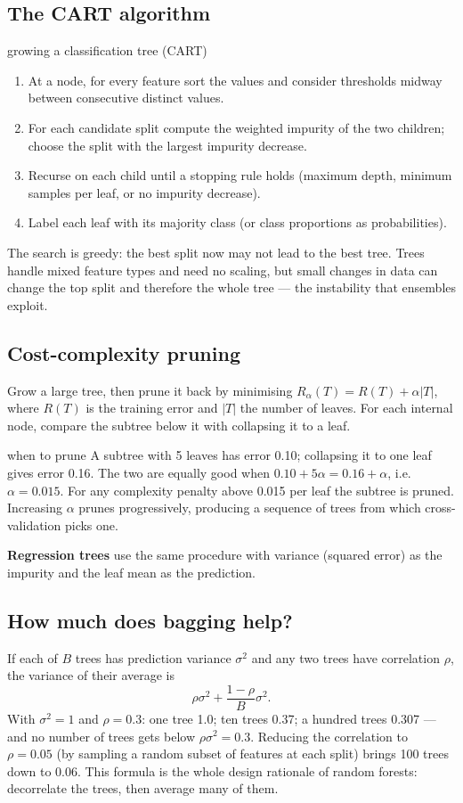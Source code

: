 \documentclass[11pt]{article}
\begin{document}
\subsection{The CART algorithm}
\begin{algo}{growing a classification tree (CART)}
\begin{enumerate}[leftmargin=1.5em]
\item At a node, for every feature sort the values and consider thresholds midway between consecutive distinct values.
\item For each candidate split compute the weighted impurity of the two children; choose the split with the largest impurity decrease.
\item Recurse on each child until a stopping rule holds (maximum depth, minimum samples per leaf, or no impurity decrease).
\item Label each leaf with its majority class (or class proportions as probabilities).
\end{enumerate}
\end{algo}
The search is greedy: the best split now may not lead to the best tree. Trees handle mixed feature types and need no scaling, but small changes in data can change the top split and therefore the whole tree --- the instability that ensembles exploit.
\subsection{Cost-complexity pruning}
Grow a large tree, then prune it back by minimising $R_\alpha(T)=R(T)+\alpha|T|$, where $R(T)$ is the training error and $|T|$ the number of leaves. For each internal node, compare the subtree below it with collapsing it to a leaf.
\begin{example}{when to prune}
A subtree with 5 leaves has error 0.10; collapsing it to one leaf gives error 0.16. The two are equally good when $0.10+5\alpha=0.16+\alpha$, i.e.\ $\alpha=0.015$. For any complexity penalty above 0.015 per leaf the subtree is pruned. Increasing $\alpha$ prunes progressively, producing a sequence of trees from which cross-validation picks one.
\end{example}
\textbf{Regression trees} use the same procedure with variance (squared error) as the impurity and the leaf mean as the prediction.

\subsection{How much does bagging help?}
If each of $B$ trees has prediction variance $\sigma^2$ and any two trees have correlation $\rho$, the variance of their average is
\[\rho\sigma^2+\frac{1-\rho}{B}\sigma^2.\]
With $\sigma^2=1$ and $\rho=0.3$: one tree 1.0; ten trees 0.37; a hundred trees 0.307 --- and no number of trees gets below $\rho\sigma^2=0.3$. Reducing the correlation to $\rho=0.05$ (by sampling a random subset of features at each split) brings 100 trees down to 0.06. This formula is the whole design rationale of random forests: decorrelate the trees, then average many of them.
\end{document}
